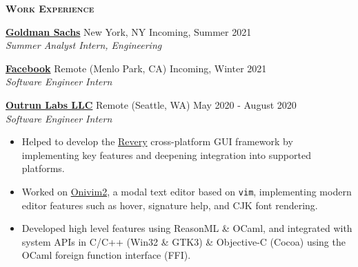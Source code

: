 \documentclass{article}
\newcommand{\sectionHeader}[1]{{\large \textbf{\textsc{#1}}}\hspace{5pt}\xrfill[.5ex]{.4pt}}
\begin{document}
  \vspace{8pt}

  \sectionHeader{Work Experience}

  \href{https://www.goldmansachs.com/}{\textbf{Goldman Sachs}} \hspace{3pt} {\footnotesize {}} New York, NY \hspace*{\fill} {\footnotesize {}} \hspace{1pt} Incoming, Summer 2021\\
  {\footnotesize {}} \hspace{1pt} \textit{Summer Analyst Intern, Engineering}

  \vspace{3pt}

  \href{https://www.facebook.com/}{\textbf{Facebook}} \hspace{3pt} {\footnotesize {}} Remote (Menlo Park, CA) \hspace*{\fill} {\footnotesize {}} \hspace{1pt} Incoming, Winter 2021\\
  {\footnotesize {}} \hspace{1pt} \textit{Software Engineer Intern}

  \vspace{3pt}

  \href{https://www.outrunlabs.com/}{\textbf{Outrun Labs LLC}} \hspace{3pt} {\footnotesize {}} Remote (Seattle, WA) \hspace*{\fill} {\footnotesize {}} \hspace{1pt} May 2020 - August 2020\\
  {\footnotesize {}} \hspace{1pt} \textit{Software Engineer Intern}
  \begin{itemize}
    \item Helped to develop the \href{https://github.com/revery-ui/revery}{Revery} cross-platform GUI framework by implementing key features and deepening integration into supported platforms.
    \item Worked on \href{https://onivim.io/}{Onivim2}, a modal text editor based on \texttt{vim}, implementing modern editor features such as hover, signature help, and CJK font rendering.
    \item Developed high level features using ReasonML \& OCaml, and integrated with system APIs in C/C++ (Win32 \& GTK3) \& Objective-C (Cocoa) using the OCaml foreign function interface (FFI).
  \end{itemize}
\end{document}
